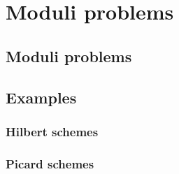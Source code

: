 \chapter{Moduli problems}
    \begin{abstract}
        
    \end{abstract}
    
    \minitoc

    \section{Moduli problems}

    \section{Examples}
        \subsection{Hilbert schemes}
        
        \subsection{Picard schemes}
